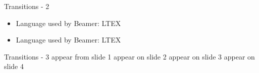 \documentclass[pdf]{beamer}
\begin{document}
\begin{frame}{Transitions - 2}
  \begin{itemize}
    \item Language used by Beamer: LTEX
    \item Language used by Beamer: LTEX
  \end{itemize}
\end{frame}

\begin{frame}{Transitions - 3}
  appear from slide 1 \newline
   {appear on slide 2 \newline}
   {appear on slide 3 \newline}
   {appear on slide 4 \newline}
\end{frame}
\end{document}
